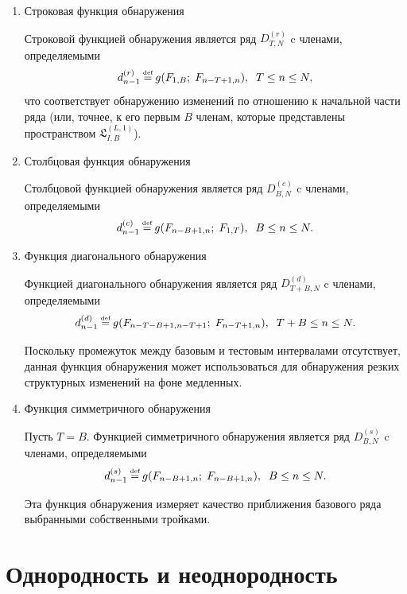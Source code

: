 \documentclass[specialist, substylefile = spbu.rtx,
			   subf, href, 12pt]{disser}
\newcommand\eqdef{\mathrel{\stackrel{\makebox[0pt]{\mbox{\normalfont\tiny def}}}{=}}}
\begin{document}
\begin{enumerate}
	\item
	Строковая функция обнаружения
	
	Строковой функцией обнаружения является ряд $ D_{T,N}^{(r)} $ c членами, определяемыми
	\begin{equation}\label{eq:d_n_r}
		d_{n-1}^{(r)} \eqdef g(F_{1, B};\; F_{n-T+1, n}), \;\; T \leq n \leq N,
	\end{equation}
	что соответствует обнаружению изменений по отношению к начальной части ряда (или, точнее, к его первым $ B $ членам, которые представлены пространством $ \mathfrak{L}_{I, B}^{(L, 1)} $).
	
	\item
	Столбцовая функция обнаружения
	
	Столбцовой функцией обнаружения является ряд $ D_{B,N}^{(c)} $ c членами, определяемыми
	\begin{equation}\label{eq:d_n_c}
		d_{n-1}^{(c)} \eqdef g(F_{n-B+1, n};\; F_{1, T}), \;\; B \leq n \leq N.
	\end{equation}
	
	\item
	Функция диагонального обнаружения
	
	Функцией диагонального обнаружения является ряд $ D_{T+B,N}^{(d)} $ c членами, определяемыми
	\begin{equation}\label{d_n_d}
		d_{n-1}^{(d)} \eqdef g(F_{n-T-B+1, n-T+1};\; F_{n-T+1, n}), \;\; T + B \leq n \leq N.
	\end{equation}
	
	Поскольку промежуток между базовым и тестовым интервалами отсутствует, данная функция обнаружения может использоваться для обнаружения резких структурных изменений на фоне медленных.
	
	\item
	Функция симметричного обнаружения
	
	Пусть $ T = B $. Функцией симметричного обнаружения является ряд $ D_{B,N}^{(s)} $ c членами, определяемыми
	\begin{equation}\label{eq:d_n_s}
		d_{n-1}^{(s)} \eqdef g(F_{n-B+1, n};\; F_{n-B+1, n}), \;\; B \leq n \leq N.
	\end{equation}
	
	Эта функция обнаружения измеряет качество приближения базового ряда выбранными собственными тройками.
	
\end{enumerate}

\section{Однородность и неоднородность}
\end{document}
